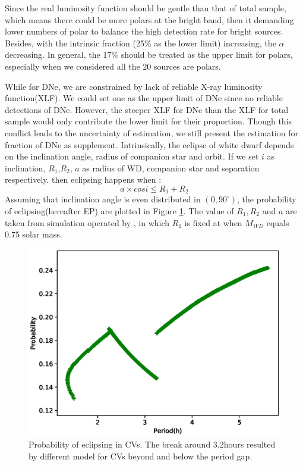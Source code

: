 \documentclass[fleqn,usenatbib]{mnras}
\begin{document}
Since the real luminosity function should be gentle than that of total sample, which means there could be more polars at the bright band, then it demanding lower numbers of polar to balance the high detection rate for bright sources. Besides, with the intrinsic fraction (25\% as the lower limit) increasing, the $\alpha$ decreasing.
In general, the 17\% should be treated as the upper limit for polars, especially when we considered all the 20 sources are polars. 

While for DNe, we are constrained by lack of reliable X-ray luminosity function(XLF). We could set one as the upper limit of DNe since no reliable detections of DNe. However, the steeper XLF for DNe than the XLF for total sample would only contribute the lower limit for their proportion. Though this conflict leads to the uncertainty of estimation,  we still present the estimation for fraction of DNe as supplement.
Intrinsically, the eclipse of white dwarf depends on the inclination angle, radius of companion star and orbit. If we set $i$ as inclination, $R_1$,$R_2$, $a$ as radius of WD, companion star and separation respectively. then eclipsing happens when :
\begin{equation}
{a \times cosi}\leq { R_1+R_2}
\end{equation}
Assuming that inclination angle is even distributed in $(0,90^\circ)$, the probability of eclipsing(hereafter EP) are plotted in Figure \ref{fig:simpCV}. The value of $R_1, R_2$ and $a$ are taken from simulation operated by \citep{2011ApJS..194...28K}, in which $R_1$ is fixed at when $M_{WD}$ equals 0.75 solar mass.
\begin{figure}
\centering
\includegraphics[scale=0.55]{./figure/p_inCV.eps}
\caption{Probability of eclipsing in CVs. The break around 3.2hours resulted by different model for CVs beyond and below the period gap.\label{fig:simpCV}}
\end{figure}
\end{document}
